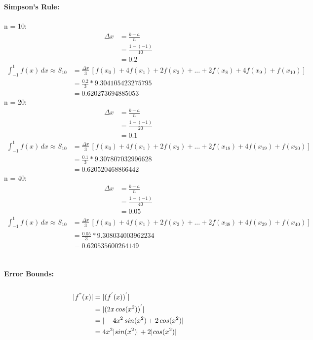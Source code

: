 \documentclass{article}
\begin{document}
    \textbf{Simpson's Rule:}\\\\
    n = 10:\\
    \begin{align*}
        \Delta x &= \frac{b-a}{n}\\
        &= \frac{1-(-1)}{10}\\
        &= 0.2
    \end{align*}
    \begin{align*}
        \int_{-1}^{1} f(x) \, dx \approx S_{10} &= \frac{\Delta x}{3} \, [f(x_0)+4f(x_1)+2f(x_2)+...+2f(x_8)+4f(x_9)+f(x_{10})] \\
        &= \frac{0.2}{3} * 9.304105423275795 \\
        &= 0.620273694885053
    \end{align*}
    n = 20:\\
    \begin{align*}
        \Delta x &= \frac{b-a}{n}\\
        &= \frac{1-(-1)}{20}\\
        &= 0.1
    \end{align*}
    \begin{align*}
        \int_{-1}^{1} f(x) \, dx \approx S_{10} &= \frac{\Delta x}{3} \, [f(x_0)+4f(x_1)+2f(x_2)+...+2f(x_{18})+4f(x_{19})+f(x_{20})] \\
        &= \frac{0.1}{3} * 9.307807032996628 \\
        &= 0.620520468866442
    \end{align*}
    n = 40:\\
    \begin{align*}
        \Delta x &= \frac{b-a}{n}\\
        &= \frac{1-(-1)}{40}\\
        &= 0.05
    \end{align*}
    \begin{align*}
        \int_{-1}^{1} f(x) \, dx \approx S_{10} &= \frac{\Delta x}{3} \, [f(x_0)+4f(x_1)+2f(x_2)+...+2f(x_{38})+4f(x_{39})+f(x_{40})] \\
        &= \frac{0.05}{3} * 9.308034003962234\\
        &= 0.620535600264149
    \end{align*} \\\\
    
    \textbf{Error Bounds:} \\\\
    \begin{align*}
       |f^{"}(x)| &= |(f^{'}(x))^{'}| \\
        &= |(2x \, cos(x^2))^{'}| \\
        &= |-4x^2\,sin(x^2)+2\,cos(x^2)| \\
        &= 4x^2|sin(x^2)| + 2|cos(x^2)|
    \end{align*}
\end{document}
